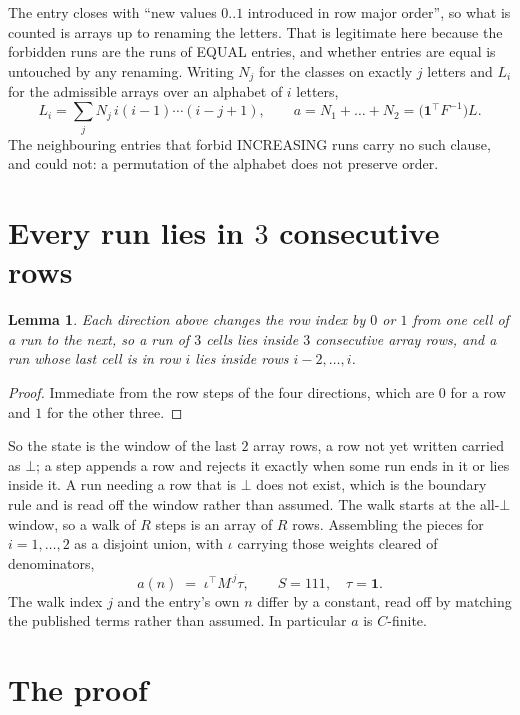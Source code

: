 \documentclass[11pt,a4paper]{article}
\theoremstyle{plain}
\newtheorem{lemma}[theorem]{Lemma}
\theoremstyle{definition}
\begin{document}
The entry closes with ``new values $0..1$ introduced in row major order'', so what is counted
is arrays up to renaming the letters. That is legitimate here because the forbidden runs are
the runs of EQUAL entries, and whether entries are equal is untouched by any renaming. Writing
$N_j$ for the classes on exactly $j$ letters and $L_i$ for the admissible arrays over an
alphabet of $i$ letters,
\[
L_i=\sum_j N_j\,i(i-1)\cdots(i-j+1),\qquad
a=N_1+\dots+N_{2}=\bigl(\mathbf{1}^{\!\top}F^{-1}\bigr)L .
\]
The neighbouring entries that forbid INCREASING runs carry no such clause, and could not: a
permutation of the alphabet does not preserve order.

\section{Every run lies in $3$ consecutive rows}

\begin{lemma}\label{lem:win}
Each direction above changes the row index by $0$ or $1$ from one cell of a run to the next, so
a run of $3$ cells lies inside $3$ consecutive array rows, and a run whose last cell is in
row $i$ lies inside rows $i-2,\dots,i$.
\end{lemma}

\begin{proof}
Immediate from the row steps of the four directions, which are $0$ for a row and $1$ for the
other three.
\end{proof}

So the state is the window of the last $2$ array rows, a row not yet written carried as
$\bot$; a step appends a row and rejects it exactly when some run ends in it or lies inside it.
A run needing a row that is $\bot$ does not exist, which is the boundary rule and is read off
the window rather than assumed. The walk starts at the all-$\bot$ window, so a walk of $R$ steps
is an array of $R$ rows. Assembling the pieces for $i=1,\dots,2$ as a disjoint union, with $\iota$ carrying those weights cleared of denominators,
\[
a(n)\;=\;\iota^{\!\top}M^{\,j}\tau ,\qquad S=111,\quad\tau=\mathbf{1} .
\]
The walk index $j$ and the entry's own $n$ differ by a constant, read off by matching the
published terms rather than assumed. In particular $a$ is $C$-finite.

\section{The proof}
\end{document}
